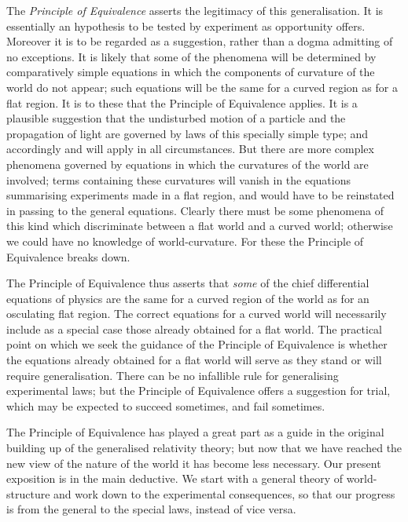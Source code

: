 \documentclass[12pt]{book}
\begin{document}
The \emph{Principle of Equivalence} asserts the legitimacy of this generalisation.
It is essentially an hypothesis to be tested by experiment as opportunity
offers. Moreover it is to be regarded as a suggestion, rather than a dogma
admitting of no exceptions. It is likely that some of the phenomena will be
determined by comparatively simple equations in which the components of
curvature of the world do not appear; such equations will be the same for
a curved region as for a flat region. It is to these that the Principle of
Equivalence applies. It is a plausible suggestion that the undisturbed motion
of a particle and the propagation of light are governed by laws of this specially
simple type; and accordingly  and  will apply in all circumstances.
But there are more complex phenomena governed by equations in which the
curvatures of the world are involved; terms containing these curvatures will
vanish in the equations summarising experiments made in a flat region, and
would have to be reinstated in passing to the general equations. Clearly
there must be some phenomena of this kind which discriminate between
a flat world and a curved world; otherwise we could have no knowledge of
world-curvature. For these the Principle of Equivalence breaks down.
%
%

The Principle of Equivalence thus asserts that \emph{some} of the chief differential
equations of physics are the same for a curved region of the world as for an
osculating flat region\footnotemark.\footnotetext
  {The correct equations for a curved world will necessarily include as a special case those
  already obtained for a flat world. The practical point on which we seek the guidance of the
  Principle of Equivalence is whether the equations already obtained for a flat world will serve as
  they stand or will require generalisation.}
There can be no infallible rule for generalising
experimental laws; but the Principle of Equivalence offers a suggestion for
trial, which may be expected to succeed sometimes, and fail sometimes.

The Principle of Equivalence has played a great part as a guide in the
original building up of the generalised relativity theory; but now that we
have reached the new view of the nature of the world it has become less
necessary. Our present exposition is in the main deductive. We start with
a general theory of world-structure and work down to the experimental
consequences, so that our progress is from the general to the special laws,
instead of vice versa.
\end{document}
